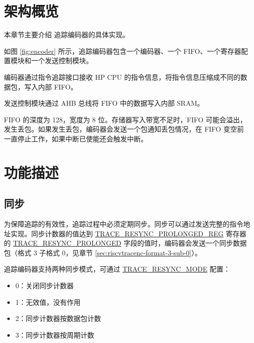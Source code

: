 \documentclass[main\_\_CN.tex]{subfiles}
\begin{document}

\section{架构概览}
\label{sec:riscvtracenc-arch-overview}


本章节主要介绍 \chipname{} 追踪编码器的具体实现。

如图 \ref{fig:encoder} 所示，追踪编码器包含一个编码器、一个 FIFO、一个寄存器配置模块和一个发送控制模块。

编码器通过指令追踪接口接收 HP CPU 的指令信息，将指令信息压缩成不同的数据包，写入内部 FIFO。

发送控制模块通过 AHB 总线将 FIFO 中的数据写入内部 SRAM。

FIFO 的深度为 128，宽度为 8 位。存储器写入带宽不足时，FIFO 可能会溢出，发生丢包。如果发生丢包，编码器会发送一个包通知丢包情况，在 FIFO 变空前一直停止工作，如果中断已使能还会触发中断。



\section{功能描述}
\label{sec:riscvtracenc-func-desc}

\subsection{同步}

为保障追踪的有效性，追踪过程中必须定期同步。同步可以通过发送完整的指令地址实现。同步计数器的值达到 \hyperref[regdesc:TRACERESYNCPROLONGEDREG]{TRACE\_RESYNC\_PROLONGED\_REG} 寄存器的 \hyperref[fielddesc:TRACERESYNCPROLONGED]{TRACE\_RESYNC\_PROLONGED} 字段的值时，编码器会发送一个同步数据包（格式 3 子格式 0，见章节 \ref{sec:riscvtracenc-format-3-sub-0}）。

追踪编码器支持两种同步模式，可通过 \hyperref[fielddesc:TRACERESYNCMODE]{TRACE\_RESYNC\_MODE} 配置：
\begin{itemize}
    \item 0：关闭同步计数器
    \item 1：无效值，没有作用
    \item 2：同步计数器按数据包计数
    \item 3：同步计数器按周期计数
\end{itemize}
\end{document}
